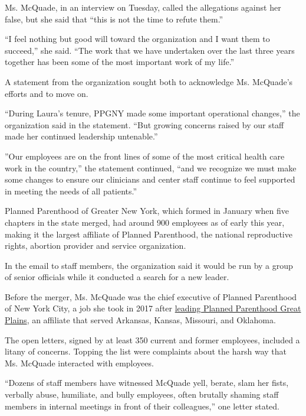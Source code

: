 Ms. McQuade, in an interview on Tuesday, called the allegations against
her false, but she said that ``this is not the time to refute them.''

``I feel nothing but good will toward the organization and I want them
to succeed,'' she said. ``The work that we have undertaken over the last
three years together has been some of the most important work of my
life.''

A statement from the organization sought both to acknowledge Ms.
McQuade's efforts and to move on.

``During Laura's tenure, PPGNY made some important operational
changes,'' the organization said in the statement. ``But growing
concerns raised by our staff made her continued leadership untenable.''

''Our employees are on the front lines of some of the most critical
health care work in the country,'' the statement continued, ``and we
recognize we must make some changes to ensure our clinicians and center
staff continue to feel supported in meeting the needs of all patients.''

Planned Parenthood of Greater New York, which formed in January when
five chapters in the state merged, had around 900 employees as of early
this year, making it the largest affiliate of Planned Parenthood, the
national reproductive rights, abortion provider and service
organization.

In the email to staff members, the organization said it would be run by
a group of senior officials while it conducted a search for a new
leader.

Before the merger, Ms. McQuade was the chief executive of Planned
Parenthood of New York City, a job she took in 2017 after
\href{https://www.columbiamissourian.com/news/local/head-of-planned-parenthood-great-plains-leaving-job-for-new-york-city-position/article_6adb5a52-4c91-11e7-bbbf-436af5c66724.html}{leading
Planned Parenthood Great Plains}, an affiliate that served Arkansas,
Kansas, Missouri, and Oklahoma.

The open letters, signed by at least 350 current and former employees,
included a litany of concerns. Topping the list were complaints about
the harsh way that Ms. McQuade interacted with employees.

``Dozens of staff members have witnessed McQuade yell, berate, slam her
fists, verbally abuse, humiliate, and bully employees, often brutally
shaming staff members in internal meetings in front of their
colleagues,'' one letter stated.

